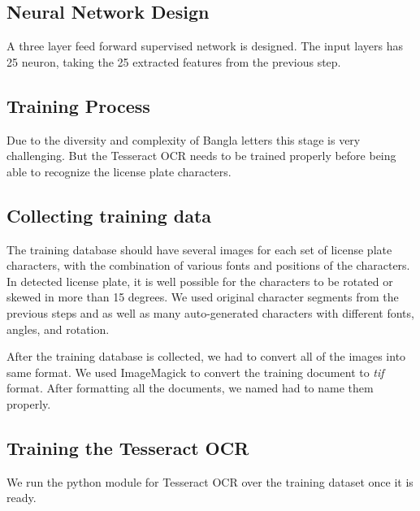 \documentclass{standalone}
\begin{document}
\subsection{Neural Network Design}
A three layer feed forward supervised network is designed. The input layers has 25 neuron, taking the 25 extracted features from the previous step. 


\subsection{Training Process}
Due to the diversity and complexity of Bangla letters this stage is very challenging. But the Tesseract OCR needs to be trained properly before being able to recognize the license plate characters.

\subsection{Collecting training data}
The training database should have several images for each set of license plate characters, with the combination of various fonts and positions of the characters. In detected license plate, it is well possible for the characters to be rotated or skewed in more than 15 degrees. We used original character segments from the previous steps and as well as many auto-generated characters with different fonts, angles, and rotation. 

After the training database is collected, we had to convert all of the images into same format. We used ImageMagick to convert the training document to {\it tif} format. After formatting all the documents, we named had to name them properly. 

\subsection{Training the Tesseract OCR}
We run the python module for Tesseract OCR over the training dataset once it is ready. 
\end{document}
